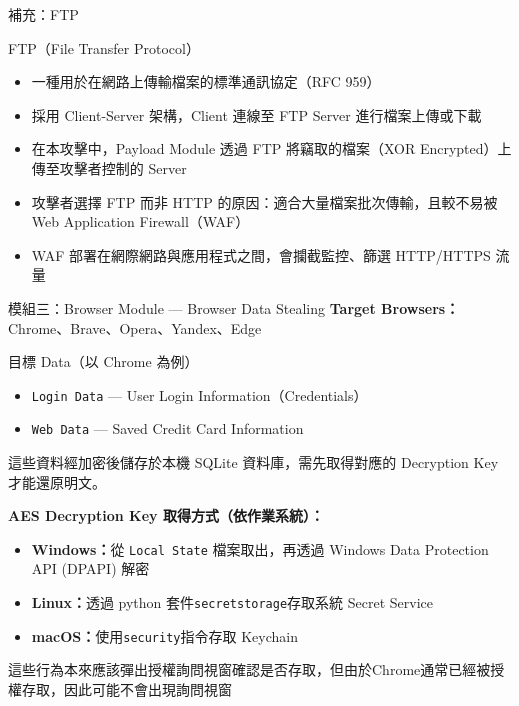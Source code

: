 \documentclass{beamer}
\begin{document}
\begin{frame}{補充：FTP}
  \begin{block}{FTP（File Transfer Protocol）}
    \begin{itemize}
      \item 一種用於在網路上傳輸檔案的標準通訊協定（RFC 959）
      \item 採用 Client-Server 架構，Client 連線至 FTP Server 進行檔案上傳或下載
      \item 在本攻擊中，Payload Module 透過 FTP 將竊取的檔案（XOR Encrypted）上傳至攻擊者控制的 Server
      \item 攻擊者選擇 FTP 而非 HTTP 的原因：適合大量檔案批次傳輸，且較不易被 Web Application Firewall（WAF） 
      \item WAF 部署在網際網路與應用程式之間，會攔截監控、篩選 HTTP/HTTPS 流量
    \end{itemize}
  \end{block}
\end{frame}

\begin{frame}{模組三：Browser Module — Browser Data Stealing}
  \textbf{Target Browsers：}Chrome、Brave、Opera、Yandex、Edge

  \vspace{0.1cm}
  \begin{block}{目標 Data（以 Chrome 為例）}
    \begin{itemize}
      \item \texttt{Login Data} — User Login Information（Credentials）
      \item \texttt{Web Data} — Saved Credit Card Information
    \end{itemize}
    這些資料經加密後儲存於本機 SQLite 資料庫，需先取得對應的 Decryption Key 才能還原明文。
  \end{block}

  \vspace{0.1cm}
  \textbf{AES Decryption Key 取得方式（依作業系統）：}
  \begin{itemize}
    \item \textbf{Windows：}從 \texttt{Local State} 檔案取出，再透過 Windows Data Protection API (DPAPI) 解密
    \item \textbf{Linux：}透過 python 套件\texttt{secretstorage}存取系統 Secret Service
    \item \textbf{macOS：}使用\texttt{security}指令存取 Keychain
  \end{itemize}

  \vspace{0.1cm}
  這些行為本來應該彈出授權詢問視窗確認是否存取，但由於Chrome通常已經被授權存取，因此可能不會出現詢問視窗
\end{frame}
\end{document}
